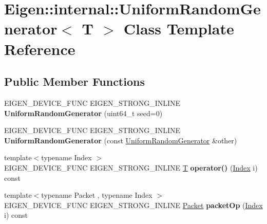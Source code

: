 \hypertarget{class_eigen_1_1internal_1_1_uniform_random_generator}{}\section{Eigen\+:\+:internal\+:\+:Uniform\+Random\+Generator$<$ T $>$ Class Template Reference}
\label{class_eigen_1_1internal_1_1_uniform_random_generator}
\subsection*{Public Member Functions}
\begin{DoxyCompactItemize}
\item 
\mbox{\label{class_eigen_1_1internal_1_1_uniform_random_generator_aedf399a1d9468154a90f5b6bca799d82}} 
E\+I\+G\+E\+N\+\_\+\+D\+E\+V\+I\+C\+E\+\_\+\+F\+U\+NC E\+I\+G\+E\+N\+\_\+\+S\+T\+R\+O\+N\+G\+\_\+\+I\+N\+L\+I\+NE {\bfseries Uniform\+Random\+Generator} (uint64\+\_\+t seed=0)
\item 
\mbox{\label{class_eigen_1_1internal_1_1_uniform_random_generator_a97b9c2bc04be36b4f511d70131d6cc24}} 
E\+I\+G\+E\+N\+\_\+\+D\+E\+V\+I\+C\+E\+\_\+\+F\+U\+NC E\+I\+G\+E\+N\+\_\+\+S\+T\+R\+O\+N\+G\+\_\+\+I\+N\+L\+I\+NE {\bfseries Uniform\+Random\+Generator} (const \hyperlink{class_eigen_1_1internal_1_1_uniform_random_generator}{Uniform\+Random\+Generator} \&other)
\item 
\mbox{\label{class_eigen_1_1internal_1_1_uniform_random_generator_a620623213b13e27aa1590dc9e605b56e}} 
{\footnotesize template$<$typename Index $>$ }\\E\+I\+G\+E\+N\+\_\+\+D\+E\+V\+I\+C\+E\+\_\+\+F\+U\+NC E\+I\+G\+E\+N\+\_\+\+S\+T\+R\+O\+N\+G\+\_\+\+I\+N\+L\+I\+NE \hyperlink{group___sparse_core___module}{T} {\bfseries operator()} (\hyperlink{namespace_eigen_a62e77e0933482dafde8fe197d9a2cfde}{Index} i) const
\item 
\mbox{\label{class_eigen_1_1internal_1_1_uniform_random_generator_a6f28e945355106c147b1d7c27ba6c995}} 
{\footnotesize template$<$typename Packet , typename Index $>$ }\\E\+I\+G\+E\+N\+\_\+\+D\+E\+V\+I\+C\+E\+\_\+\+F\+U\+NC E\+I\+G\+E\+N\+\_\+\+S\+T\+R\+O\+N\+G\+\_\+\+I\+N\+L\+I\+NE \hyperlink{union_eigen_1_1internal_1_1_packet}{Packet} {\bfseries packet\+Op} (\hyperlink{namespace_eigen_a62e77e0933482dafde8fe197d9a2cfde}{Index} i) const

\end{DoxyCompactItemize}
